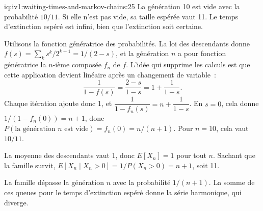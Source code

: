 \begin{solution}{iq:iv1:waiting-times-and-markov-chains:25}
La génération 10 est vide avec la probabilité $10/11$. Si elle n'est pas vide, sa taille espérée vaut 11. Le temps d'extinction espéré est infini, bien que l'extinction soit certaine.

\begin{sloppypar}Utilisons la fonction génératrice des probabilités. La loi des descendants donne $f(s) = \sum_k s^k/2^{k+1} = 1/(2 - s)$, et la génération $n$ a pour fonction génératrice la $n$-ième composée $f_n$ de $f$. L'idée qui supprime les calculs est que cette application devient linéaire après un changement de variable~:
\[
\frac{1}{1 - f(s)} = \frac{2 - s}{1 - s} = 1 + \frac{1}{1 - s}.
\]
Chaque itération ajoute donc 1, et $\dfrac{1}{1 - f_n(s)} = n + \dfrac{1}{1 - s}$. En $s = 0$, cela donne $1/(1 - f_n(0)) = n + 1$, donc $P(\text{la génération } n \text{ est vide}) = f_n(0) = n/(n+1)$. Pour $n = 10$, cela vaut $10/11$.\end{sloppypar}

La moyenne des descendants vaut 1, donc $E[X_n] = 1$ pour tout $n$. Sachant que la famille survit, $E[X_n \mid X_n > 0] = 1/P(X_n > 0) = n + 1$, soit 11.

La famille dépasse la génération $n$ avec la probabilité $1/(n + 1)$. La somme de ces queues pour le temps d'extinction espéré donne la série harmonique, qui diverge.

\end{solution}
